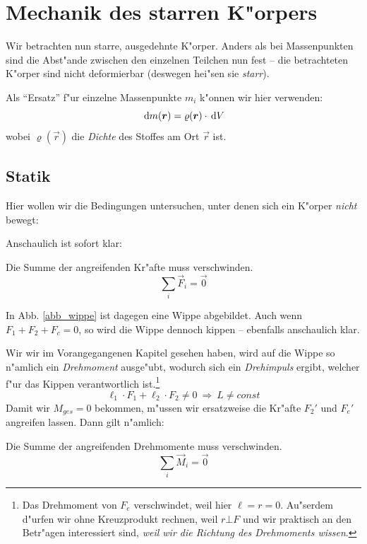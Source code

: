 \chapter{Mechanik des starren K"orpers}
\label{kap_mechanik-des-starren-korpers-1}


Wir betrachten nun starre, ausgedehnte K"orper. Anders als bei
Massenpunkten sind die Abst"ande zwischen den einzelnen Teilchen nun
fest -- die betrachteten K"orper sind nicht deformierbar (deswegen
hei"sen sie \emph{starr}).

Als "`Ersatz"' f"ur einzelne Massenpunkte $m_i$ k"onnen wir hier
verwenden:
\begin{equation}
   \label{eq:33}
   \, \mathrm{d} m (\boldsymbol{r}) = \varrho (\boldsymbol{r}) \cdot \, \mathrm{d} V
\end{equation}
wobei $\varrho(\vec r)$ die \emph{Dichte} des Stoffes am Ort $\vec r$
ist.









\section{Statik}
\label{kap_statik}


Hier wollen wir die Bedingungen untersuchen, unter denen sich ein
K"orper \emph{nicht} bewegt:

Anschaulich ist sofort klar:
\begin{Wichtig}
Die Summe der angreifenden Kr"afte muss verschwinden.
\begin{equation}
   \label{eqn_statik_bed_kraft}
   \boxed{
\sum_i \vec F_i = \vec 0
}
\end{equation}
\end{Wichtig}

In Abb. \ref{abb_wippe} ist dagegen eine Wippe abgebildet. Auch wenn
$F_1 + F_2 + F_c = 0$, so wird die Wippe dennoch kippen  -- ebenfalls
anschaulich klar.

Wir wir im Vorangegangenen Kapitel gesehen haben, wird auf die Wippe
so n"amlich ein \emph{Drehmoment} ausge"ubt, wodurch sich ein
\emph{Drehimpuls} ergibt, welcher f"ur das Kippen verantwortlich
ist.\footnote{Das Drehmoment von $F_e$ verschwindet, weil hier $\ell =
  r=
  0$. Au"serdem d"urfen wir ohne Kreuzprodukt rechnen, weil $r \bot F$
  und wir praktisch an den Betr"agen interessiert sind, \emph{weil wir
    die Richtung des Drehmoments wissen}.}
\begin{equation}
   \label{eq:36}
   \ell_1 \cdot F_1 + \ell_2 \cdot F_2 \neq 0 ~ \Rightarrow ~ L \neq const
\end{equation}
Damit wir $M_{ges} = 0$ bekommen, m"ussen wir {ersatzweise} die Kr"afte $F_2'$ und
$F_e'$ angreifen lassen. Dann gilt n"amlich:
\begin{Wichtig}
Die Summe der angreifenden Drehmomente muss verschwinden.
\begin{equation}
   \label{eqn_statik_bed_drehmoment}
   \boxed{
\sum_i \vec M_i = \vec 0
}
\end{equation}
\end{Wichtig}

